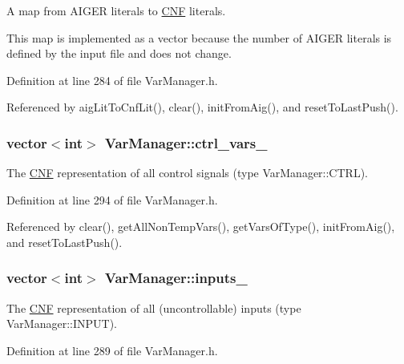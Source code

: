 A map from A\-I\-G\-E\-R literals to \hyperlink{classCNF}{C\-N\-F} literals. 

This map is implemented as a vector because the number of A\-I\-G\-E\-R literals is defined by the input file and does not change. 

Definition at line 284 of file Var\-Manager.\-h.



Referenced by aig\-Lit\-To\-Cnf\-Lit(), clear(), init\-From\-Aig(), and reset\-To\-Last\-Push().

\hypertarget{classVarManager_acb66edc1a4fc8ccc25321a59fe1668ff}{
\subsubsection[{ctrl\-\_\-vars\-\_\-}]{\setlength{\rightskip}{0pt plus 5cm}vector$<$int$>$ Var\-Manager\-::ctrl\-\_\-vars\-\_\-\hspace{0.3cm}{\ttfamily [protected]}}}\label{classVarManager_acb66edc1a4fc8ccc25321a59fe1668ff}


The \hyperlink{classCNF}{C\-N\-F} representation of all control signals (type Var\-Manager\-::\-C\-T\-R\-L). 



Definition at line 294 of file Var\-Manager.\-h.



Referenced by clear(), get\-All\-Non\-Temp\-Vars(), get\-Vars\-Of\-Type(), init\-From\-Aig(), and reset\-To\-Last\-Push().

\hypertarget{classVarManager_a04609c1f6a3c87c10abcfbd3850a2f87}{
\subsubsection[{inputs\-\_\-}]{\setlength{\rightskip}{0pt plus 5cm}vector$<$int$>$ Var\-Manager\-::inputs\-\_\-\hspace{0.3cm}{\ttfamily [protected]}}}\label{classVarManager_a04609c1f6a3c87c10abcfbd3850a2f87}


The \hyperlink{classCNF}{C\-N\-F} representation of all (uncontrollable) inputs (type Var\-Manager\-::\-I\-N\-P\-U\-T). 



Definition at line 289 of file Var\-Manager.\-h.




